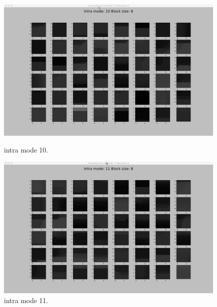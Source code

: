 \begin{figure}[H]

    \vspace*{1cm} %

    \begin{minipage}{0.49\textwidth}
        \includegraphics[width=\linewidth]{Figures/visu-size8x8/8-10}
        \caption[Intra mode 10]{intra mode 10.}
        \label{fig:size8_mode4}
    \end{minipage}
    \hspace{\fill} %
    \begin{minipage}{0.49\textwidth}
        \includegraphics[width=\linewidth]{Figures/visu-size8x8/8-11}
        \caption[Intra mode 11]{intra mode 11.}
        \label{fig:size8_mode11}
    \end{minipage}
    
    \vspace*{1cm} %
    

\end{figure}
